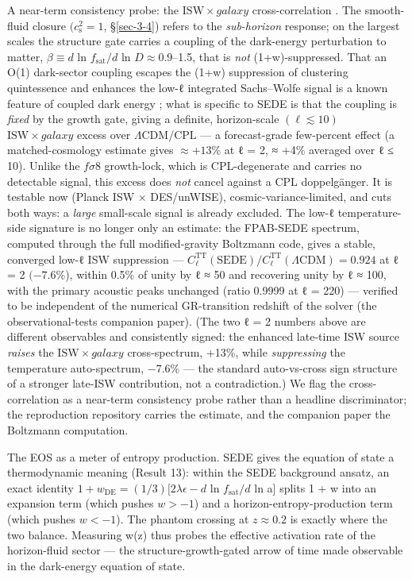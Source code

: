 \documentclass[preprint,12pt]{elsarticle}
\begin{document}
A near-term consistency probe: the \(\mathrm{ISW}\times galaxy\)
cross-correlation \citep{Afshordi:2004kz}. The smooth-fluid closure
\((c_{\mathrm{s}}^{2} = 1\), §\ref{sec-3-4}) refers to the
\emph{sub-horizon} response; on the largest scales the structure gate
carries a coupling of the dark-energy perturbation to matter,
\(\beta  \equiv  d\) ln \(f_{\mathrm{sat}}/d\) ln
\(D \approx  0.9\)--1.5, that is \emph{not} (1+w)-suppressed. That an
O(1) dark-sector coupling escapes the (1+w) suppression of clustering
quintessence and enhances the low-ℓ integrated Sachs--Wolfe signal is a
known feature of coupled dark energy
\citep{Schafer:2008uc, Mainini:2007ft, Hu:2004yd}; what is specific to
SEDE is that the coupling is \emph{fixed} by the growth gate, giving a
definite, horizon-scale \((\ell  \lesssim  10)\)
\(\mathrm{ISW}\times galaxy\) excess over
\(\Lambda \mathrm{CDM}/\mathrm{CPL}\) --- a forecast-grade few-percent
effect (a matched-cosmology estimate gives \(\approx  +13\)\% at ℓ = 2,
≈ +4\% averaged over ℓ ≤ 10). Unlike the \(f\sigma 8\) growth-lock,
which is CPL-degenerate and carries no detectable signal, this excess
does \emph{not} cancel against a CPL doppelgänger. It is testable now
(Planck ISW × DES/unWISE), cosmic-variance-limited, and cuts both ways:
a \emph{large} small-scale signal is already excluded. The low-ℓ
temperature-side signature is no longer only an estimate: the FPAB-SEDE
spectrum, computed through the full modified-gravity Boltzmann code,
gives a stable, converged low-ℓ ISW suppression ---
\(C_\ell ^\mathrm{TT}(\mathrm{SEDE})/C_\ell ^\mathrm{TT}(\Lambda \mathrm{CDM}) = 0.924\)
at ℓ = 2 \((-7.6\)\%), within 0.5\% of unity by ℓ ≈ 50 and recovering
unity by ℓ ≈ 100, with the primary acoustic peaks unchanged (ratio
0.9999 at ℓ = 220) --- verified to be independent of the numerical
GR-transition redshift of the solver (the observational-tests companion
paper). (The two ℓ = 2 numbers above are different observables and
consistently signed: the enhanced late-time ISW source \emph{raises} the
\(\mathrm{ISW}\times galaxy\) cross-spectrum, +13\%, while
\emph{suppressing} the temperature auto-spectrum, −7.6\% --- the
standard auto-vs-cross sign structure of a stronger late-ISW
contribution, not a contradiction.) We flag the cross-correlation as a
near-term consistency probe rather than a headline discriminator; the
reproduction repository carries the estimate, and the companion paper
the Boltzmann computation.

The EOS as a meter of entropy production. SEDE gives the equation of
state a thermodynamic meaning (Result 13): within the SEDE background
ansatz, an exact identity
\(1 + w_\mathrm{DE} = (1/3)[2\lambda \epsilon  - d\) ln
\(f_{\mathrm{sat}}/d\) ln a{]} splits 1 + w into an expansion term
(which pushes \(w > -1\)) and a horizon-entropy-production term (which
pushes \(w < -1\)). The phantom crossing at \(z \approx  0.2\) is
exactly where the two balance. Measuring w(z) thus probes the effective
activation rate of the horizon-fluid sector --- the
structure-growth-gated arrow of time made observable in the dark-energy
equation of state.
\end{document}
